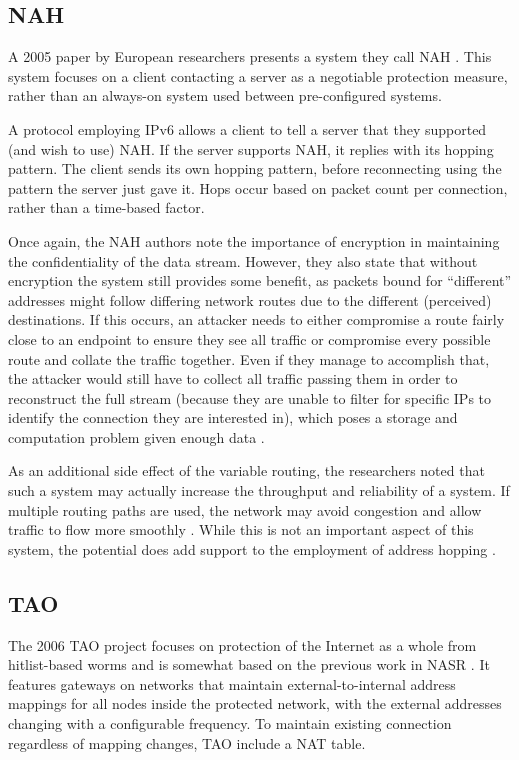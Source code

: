\subsection{\acf{NAH}}
\par A 2005 paper by European researchers presents a system they call \acf{NAH} \cite{NAH}. This system focuses on a client contacting a server as a negotiable protection measure, rather than an always-on system used between pre-configured systems.

\par A protocol employing \ac{IPv6} allows a client to tell a server that they supported (and wish to use) \ac{NAH}. If the server supports NAH, it replies with its hopping pattern. The client sends its own hopping pattern, before reconnecting using the pattern the server just gave it. Hops occur based on packet count per connection, rather than a time-based factor.

\par Once again, the NAH authors note the importance of encryption in maintaining the confidentiality of the data stream. However, they also state that without encryption the system still provides some benefit, as packets bound for ``different'' addresses might follow differing network routes due to the different (perceived) destinations. If this occurs, an attacker needs to either compromise a route fairly close to an endpoint to ensure they see all traffic or compromise every possible route and collate the traffic together. Even if they manage to accomplish that, the attacker would still have to collect all traffic passing them in order to reconstruct the full stream (because they are unable to filter for specific \acp{IP} to identify the connection they are interested in), which poses a storage and computation problem given enough data \cite{NAH}.

\par As an additional side effect of the variable routing, the researchers noted that such a system may actually increase the throughput and reliability of a system. If multiple routing paths are used, the network may avoid congestion and allow traffic to flow more smoothly \cite{MultimediaDistributed}. While this is not an important aspect of this system, the potential does add support to the employment of address hopping \cite{NAH}.

\subsection{\acf{TAO}}
\par The 2006 \ac{TAO} project focuses on protection of the Internet as a whole from hitlist-based worms and is somewhat based on the previous work in \ac{NASR} \cite{NASR}. It features gateways on networks that maintain external-to-internal address mappings for all nodes inside the protected network, with the external addresses changing with a configurable frequency. To maintain existing connection regardless of mapping changes, TAO include a \ac{NAT} table. 

